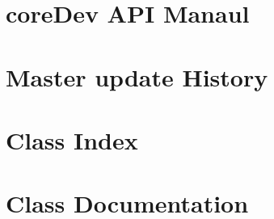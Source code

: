 \documentclass[twoside]{book}
\begin{document}
\chapter{core\-Dev A\-P\-I Manaul}
\label{md__home_kimdj_project_coreDoc_doc_coredev_api}
\hypertarget{md__home_kimdj_project_coreDoc_doc_coredev_api}{}

\chapter{Master update History}
\label{md__home_kimdj_project_decat_doc_MasterHistory}
\hypertarget{md__home_kimdj_project_decat_doc_MasterHistory}{}

\chapter{Class Index}

\chapter{Class Documentation}


















\newpage
{}
{}
\printindex
\end{document}
